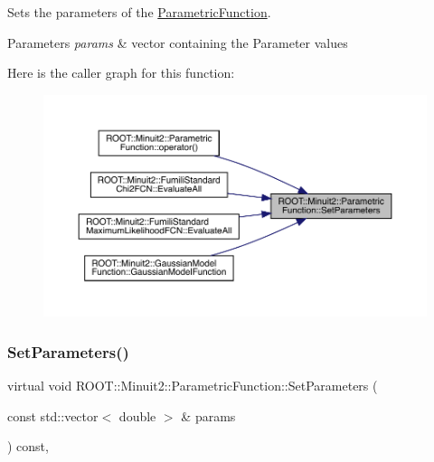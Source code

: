 Sets the parameters of the \mbox{\hyperlink{classROOT_1_1Minuit2_1_1ParametricFunction}{Parametric\+Function}}.


\begin{DoxyParams}{Parameters}
{\em params} & vector containing the Parameter values \\
\hline
\end{DoxyParams}
Here is the caller graph for this function\+:\nopagebreak
\begin{figure}[H]
\begin{center}
\leavevmode
\includegraphics[width=350pt]{d3/d76/classROOT_1_1Minuit2_1_1ParametricFunction_a63417244db376ec27f2c85ee6432f552_icgraph}
\end{center}
\end{figure}
\mbox{\label{classROOT_1_1Minuit2_1_1ParametricFunction_a63417244db376ec27f2c85ee6432f552}} 
\subsubsection{\texorpdfstring{SetParameters()}{SetParameters()}\hspace{0.1cm}{\footnotesize\ttfamily [2/2]}}
{\footnotesize\ttfamily virtual void R\+O\+O\+T\+::\+Minuit2\+::\+Parametric\+Function\+::\+Set\+Parameters (\begin{DoxyParamCaption}\item[{const std\+::vector$<$ double $>$ \&}]{params }\end{DoxyParamCaption}) const\hspace{0.3cm}{\ttfamily [inline]}, {\ttfamily [virtual]}}

